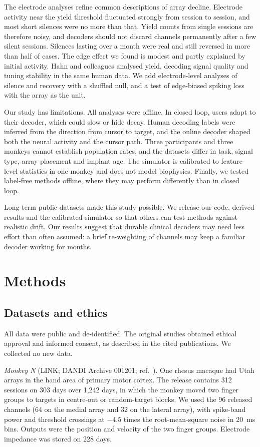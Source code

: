 \documentclass[pdflatex,sn-nature]{sn-jnl}
\begin{document}
The electrode analyses refine common descriptions of array decline. Electrode activity near the yield threshold
fluctuated strongly from session to session, and most short silences were no more than that. Yield counts from single
sessions are therefore noisy, and decoders should not discard channels permanently after a few silent sessions.
Silences lasting over a month were real and still reversed in more than half of cases. The edge effect we found is
modest and partly explained by initial activity. Hahn and colleagues analysed yield, decoding signal quality and tuning
stability in the same human data\cite{hahn2026}. We add electrode-level analyses of silence and recovery with a
shuffled null, and a test of edge-biased spiking loss with the array as the unit.

Our study has limitations. All analyses were offline. In closed loop, users adapt to their decoder\cite{gilja2012},
which could slow or hide decay. Human decoding labels were inferred from the direction from cursor to target, and the
online decoder shaped both the neural activity and the cursor path. Three participants and three monkeys cannot
establish population rates, and the datasets differ in task, signal type, array placement and implant age. The simulator
is calibrated to feature-level statistics in one monkey and does not model biophysics. Finally, we tested label-free
methods offline, where they may perform differently than in closed loop.

Long-term public datasets made this study possible. We release our code, derived results and the calibrated simulator
so that others can test methods against realistic drift. Our results suggest that durable clinical decoders may need
less effort than often assumed: a brief re-weighting of channels may keep a familiar decoder working for months.

\section*{Methods}

\subsection*{Datasets and ethics}

All data were public and de-identified. The original studies obtained ethical approval and informed consent, as
described in the cited publications. We collected no new data.

\textit{Monkey N} (LINK; DANDI Archive 001201\cite{data_link}; ref.~\cite{temmar2025}). One rhesus macaque had Utah arrays
in the hand area of primary motor cortex\cite{nason2021}. The release contains 312 sessions on 303 days over 1,242 days,
in which the monkey moved two finger groups to targets in centre-out or random-target blocks. We used the 96 released
channels (64 on the medial array and 32 on the lateral array), with spike-band power and threshold crossings at $-4.5$
times the root-mean-square noise in 20~ms bins\cite{nason2020}. Outputs were the position and velocity of the two
finger groups. Electrode impedance was stored on 228 days.
\end{document}
